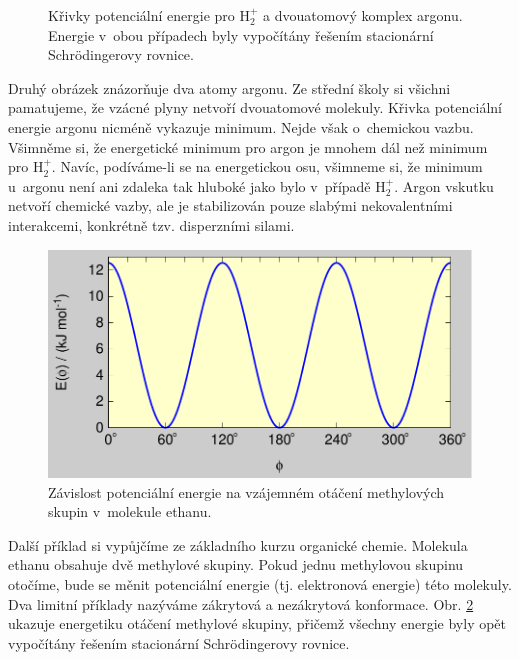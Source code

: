 \begin{figure} [ht]
\caption{Křivky potenciální energie pro $\mathrm{H}_2^+$ a dvouatomový komplex argonu. Energie v~obou případech byly vypočítány řešením stacionární Schrödingerovy rovnice.}
\label{obr:mol:H2_Ar}
\end{figure}

Druhý obrázek znázorňuje dva atomy argonu. Ze střední školy si všichni pamatujeme, že vzácné plyny netvoří dvouatomové molekuly. Křivka potenciální energie argonu nicméně vykazuje minimum. Nejde však o~chemickou vazbu. Všimněme si, že energetické minimum pro argon je mnohem dál než minimum pro $\mathrm{H}_2^+$. Navíc, podíváme-li se na energetickou osu, všimneme si, že minimum u~argonu není ani zdaleka tak hluboké jako bylo v~případě $\mathrm{H}_2^+$. Argon vskutku netvoří chemické vazby, ale je stabilizován pouze slabými nekovalentními interakcemi, konkrétně tzv. disperzními silami.


\begin{figure} [ht]
\centering
\includegraphics[scale=0.9]{obrazky/ethane.pdf}
\caption{Závislost potenciální energie na vzájemném otáčení methylových skupin v~molekule ethanu.}
\label{obr:mol:ethan}
\end{figure}

Další příklad si vypůjčíme ze základního kurzu organické chemie. Molekula ethanu obsahuje dvě methylové skupiny. Pokud jednu methylovou skupinu otočíme, bude se měnit potenciální energie (tj. elektronová energie) této molekuly. Dva limitní příklady nazýváme zákrytová a nezákrytová konformace. Obr. \ref{obr:mol:ethan} ukazuje energetiku otáčení methylové skupiny, přičemž všechny energie byly opět vypočítány řešením stacionární Schrödingerovy rovnice.

